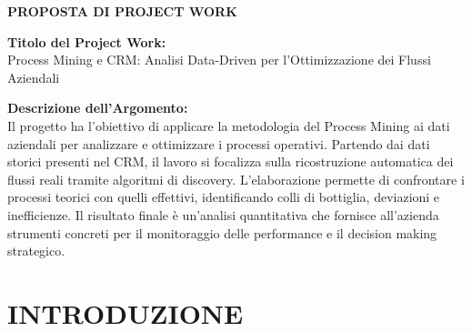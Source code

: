 \documentclass[12pt, a4paper]{report}
\begin{document}



\begin{center}
    \textbf{\Large PROPOSTA DI PROJECT WORK}
\end{center}
\vspace{1cm}

\textbf{Titolo del Project Work:}\\
Process Mining e CRM: Analisi Data-Driven per l'Ottimizzazione dei Flussi Aziendali

\vspace{1cm}

\textbf{Descrizione dell'Argomento:}\\
Il progetto ha l'obiettivo di applicare la metodologia del Process Mining ai dati aziendali per analizzare e ottimizzare i processi operativi. Partendo dai dati storici presenti nel CRM, il lavoro si focalizza sulla ricostruzione automatica dei flussi reali tramite algoritmi di discovery. L'elaborazione permette di confrontare i processi teorici con quelli effettivi, identificando colli di bottiglia, deviazioni e inefficienze. Il risultato finale è un'analisi quantitativa che fornisce all'azienda strumenti concreti per il monitoraggio delle performance e il decision making strategico.

\vspace{2cm}


\cleardoublepage
{} %
\tableofcontents
\newpage

\chapter*{INTRODUZIONE}
\end{document}

